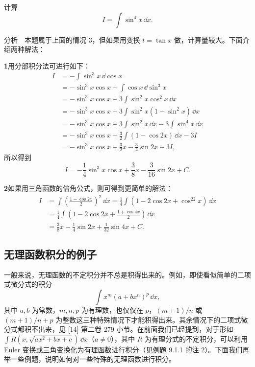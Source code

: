 \begin{xexample}[9.2.6]
计算
\[
  I=\int\sin^4x\,\dd x.
\]
\end{xexample}

分析　本题属于上面的情况 3，但如果用变换 $t=\tan x$ 做，计算量较大。下面介绍两种解法：

\begin{xsolution}
\textbf{1}\quad 用分部积分法可进行如下：
\begin{align*}
  I
  &=-\int\sin^3x\,\dd\cos x\\
  &=-\sin^3x\cos x+\int\cos x\,\dd\sin^3x\\
  &=-\sin^3x\cos x+3\int\sin^2x\cos^2x\,\dd x\\
  &=-\sin^3x\cos x+3\int\sin^2x(1-\sin^2x)\,\dd x\\
  &=-\sin^3x\cos x+3\int\sin^2x\,\dd x-3\int\sin^4x\,\dd x\\
  &=-\sin^3x\cos x+\frac32\int(1-\cos2x)\,\dd x-3I\\
  &=-\sin^3x\cos x+\frac32x-\frac34\sin2x-3I,
\end{align*}
所以得到
\[
  I=-\frac14\sin^3x\cos x+\frac38x-\frac3{16}\sin2x+C.
\]
\end{xsolution}

\begin{xsolution}
\textbf{2}\quad 如果用三角函数的倍角公式，则可得到更简单的解法：
\begin{align*}
  I
  &=\int\left(\frac{1-\cos2x}{2}\right)^2\,\dd x
   =\frac14\int(1-2\cos2x+\cos^22x)\,\dd x\\
  &=\frac14\int\left(1-2\cos2x+\frac{1+\cos4x}{2}\right)\,\dd x\\
  &=\frac38x-\frac14\sin2x+\frac1{32}\sin4x+C.
\end{align*}
\end{xsolution}

\subsection{无理函数积分的例子}

一般来说，无理函数的不定积分并不总是积得出来的。例如，即使看似简单的二项式微分式的积分
\[
  \int x^m(a+bx^n)^p\,\dd x,
\]
其中 $a,b$ 为常数，$m,n,p$ 为有理数，也仅仅在 $p$，$(m+1)/n$ 或 $(m+1)/n+p$ 为整数这三种特殊情况下才能积得出来。其余情况下的二项式微分式都积不出来，见 [14] 第二卷 279 小节。在前面我们已经提到，对于形如 $\int R(x,\sqrt{ax^2+bx+c})\,\dd x$（$a\ne0$），其中 $R$ 为有理分式的不定积分，可以利用 Euler 变换或三角变换化为有理函数进行积分（见例题 9.1.1 的注 2）。下面我们再举一些例题，说明如何对一些特殊的无理函数进行积分。

